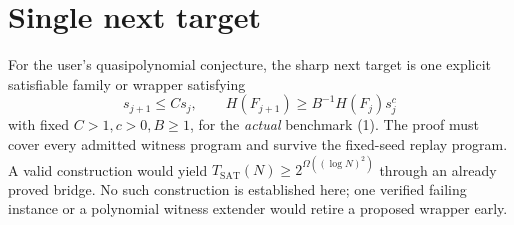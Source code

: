 \documentclass[11pt]{article}
\newcommand{\SAT}{\operatorname{SAT}}
\begin{document}
\section*{Single next target}
For the user's quasipolynomial conjecture, the sharp next target is one
explicit satisfiable family or wrapper satisfying
\[
 s_{j+1}\le Cs_j,\qquad
 H(F_{j+1})\ge B^{-1}H(F_j)s_j^c
\]
with fixed $C>1,c>0,B\ge1$, for the \emph{actual} benchmark (1).
The proof must cover every admitted witness program and survive the
fixed-seed replay program. A valid construction would yield
$T_{\SAT}(N)\ge2^{\Omega((\log N)^2)}$ through an already proved bridge.
No such construction is established here; one verified failing instance
or a polynomial witness extender would retire a proposed wrapper early.



\end{document}
